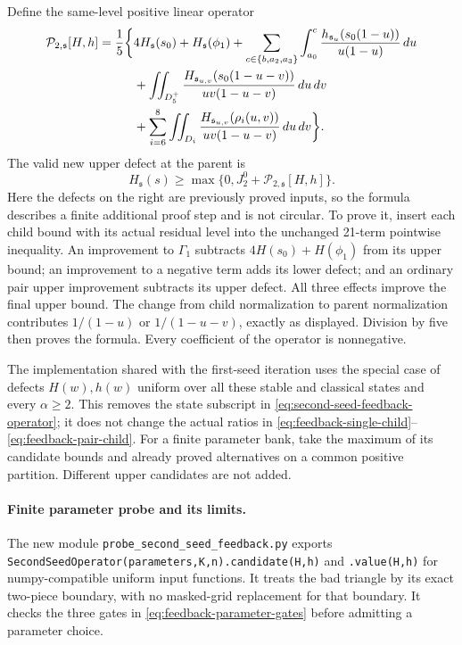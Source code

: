 Define the same-level positive linear operator
\begin{align}
 \mathcal P_{2,\mathfrak s}[H,h]
 =\frac15\bigg\{&4H_{\mathfrak s}(s_0)+H_{\mathfrak s}(\phi_1)
 +\sum_{c\in\{b,a_2,a_3\}}\int_{a_0}^{c}
 \frac{h_{\mathfrak s_u}(s_0(1-u))}{u(1-u)}\,du\notag\\
 &+\iint_{D_5^+}
 \frac{H_{\mathfrak s_{u,v}}(s_0(1-u-v))}
      {uv(1-u-v)}\,du\,dv\notag\\
 &+\sum_{i=6}^8\iint_{D_i}
 \frac{H_{\mathfrak s_{u,v}}(\rho_i(u,v))}
      {uv(1-u-v)}\,du\,dv\bigg\}.
 \label{eq:second-seed-feedback-operator}
\end{align}
The valid new upper defect at the parent is
\begin{equation}\label{eq:second-seed-feedback-bound}
 H_{\mathfrak s}(s)\ge
 \max\{0,J_2^0+\mathcal P_{2,\mathfrak s}[H,h]\}.
\end{equation}
Here the defects on the right are previously proved inputs, so the
formula describes a finite additional proof step and is not circular.
To prove it, insert each child bound with its actual residual level
into the unchanged 21-term pointwise inequality.  An improvement
to $\Gamma_1$ subtracts $4H(s_0)+H(\phi_1)$ from its upper bound;
an improvement to a negative term adds its lower defect; and an
ordinary pair upper improvement subtracts its upper defect.
All three effects improve the final upper bound.  The change from
child normalization to parent normalization contributes
$1/(1-u)$ or $1/(1-u-v)$, exactly as displayed.  Division by five
then proves the formula.  Every coefficient of the operator is
nonnegative.

The implementation shared with the first-seed iteration uses the
special case of defects $H(w),h(w)$ uniform over all these stable
and classical states and every $\alpha\ge2$.  This removes the
state subscript in \eqref{eq:second-seed-feedback-operator}; it does
not change the actual ratios in
\eqref{eq:feedback-single-child}--\eqref{eq:feedback-pair-child}.
For a finite parameter bank, take the maximum of its candidate
bounds and already proved alternatives on a common positive
partition.  Different upper candidates are not added.

\paragraph{Finite parameter probe and its limits.}
The new module \texttt{probe\_second\_seed\_feedback.py} exports
\texttt{SecondSeedOperator(parameters,K,n).candidate(H,h)} and
\texttt{.value(H,h)} for numpy-compatible uniform input functions.
It treats the bad triangle by its exact two-piece boundary, with
no masked-grid replacement for that boundary.  It checks the
three gates in \eqref{eq:feedback-parameter-gates} before admitting
a parameter choice.

